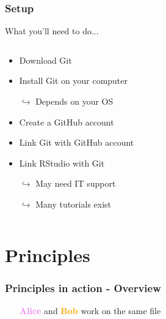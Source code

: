 \documentclass[xcolor=x11names,compress]{beamer}
\renewcommand{\(}{\begin{columns}}
\renewcommand{\)}{\end{columns}}
\newcommand{\<}[1]{\begin{column}{#1}}
\renewcommand{\>}{\end{column}}
\begin{document}
\begin{frame}
\frametitle{Setup}

What you'll need to do...
\begin{columns}[t]
 \begin{column}{0.8\textwidth}

 \begin{itemize}[<+->]
        \item Download Git
        \item Install Git on your computer
        \item[$\hookrightarrow$]  Depends on your OS
        \item Create a  GitHub account
        \item Link Git with GitHub account
        \item Link RStudio with Git
        \item[$\hookrightarrow$] May need IT support
        \item[$\hookrightarrow$] Many tutorials exist
    \end{itemize}
 \end{column}
  \begin{column}{0.2\textwidth}
    \begin{center}
    \begin{itemize}
    \end{itemize}
    \end{center}
  \end{column}
\end{columns}
\end{frame}

\section{Principles}

\begin{frame}
\frametitle{Principles in action - Overview}
\begin{itemize}
\item[] \textcolor{violet}{\textbf{Alice}} and \textcolor{orange}{\textbf{Bob}} work on the same file\\ \vspace{1cm}
\end{itemize}
\end{frame}
\end{document}
